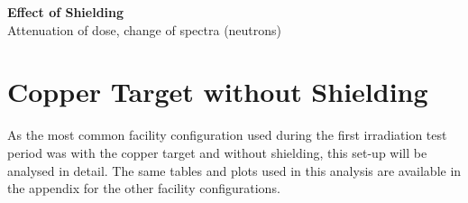 \documentclass[main.tex]{subfiles}
\begin{document}
\textbf{Effect of Shielding} \\
Attenuation of dose, change of spectra (neutrons) \\

\clearpage
\section*{Copper Target without Shielding}

As the most common facility configuration used during the first irradiation test period was with the copper target and without shielding, this set-up will be analysed in detail. The same tables and plots used in this analysis are available in the appendix for the other facility configurations. \\

\end{document}
